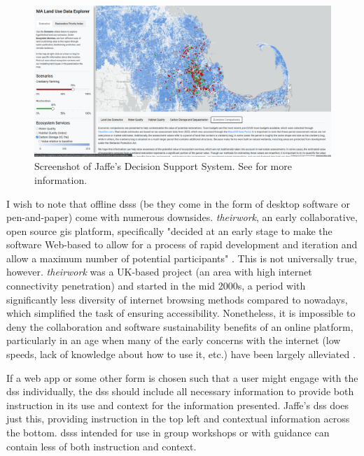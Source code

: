 \begin{figure}[!htb]
	\centering
	\includegraphics[scale=0.2]{Figures/chap3/jaffe_application.png}
	\caption[Screenshot of Jaffe's Decision Support System] {Screenshot of Jaffe's Decision Support System. See \cite{jaffeEnvironmentalEconomicSystems2022} for more information.}
	\label{fig:jaffe_application}
\end{figure}

I wish to note that offline \acp{dss} (be they come in the form of desktop software or pen-and-paper) come with numerous downsides. \textit{theirwork}, an early collaborative, open source \ac{gis} platform, specifically "decided at an early stage to make the software Web-based to allow for a process of rapid development and iteration and allow a maximum number of potential participants" \cite{williamsonTheirworkDevelopmentSustainable2011}. This is not universally true, however. \textit{theirwork} was a UK-based project (an area with high internet connectivity penetration) and started in the mid 2000s, a period with significantly less diversity of internet browsing methods compared to nowadays, which simplified the task of ensuring accessibility. Nonetheless, it is impossible to deny the collaboration and software sustainability benefits of an online platform, particularly in an age when many of the early concerns with the internet (low speeds, lack of knowledge about how to use it, etc.) have been largely alleviated \cite{shifterInteractiveMultimediaPlanning1995}.

If a web app or some other form is chosen such that a user might engage with the \ac{dss} individually, the \ac{dss} should include all necessary information to provide both instruction in its use and context for the information presented. Jaffe's \ac{dss} does just this, providing instruction in the top left and contextual information across the bottom. \acp{dss} intended for use in group workshops or with guidance can contain less of both instruction and context.

